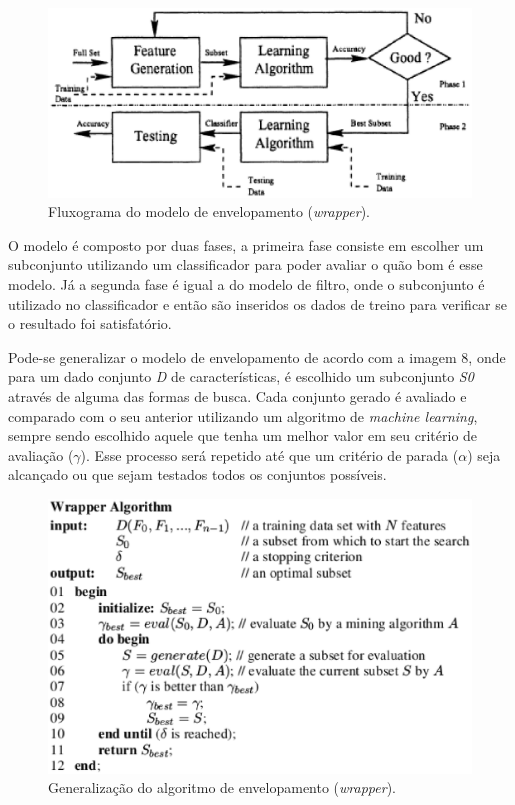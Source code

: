 \begin{figure}[h]
	\centering
	\label{fig07}
		\includegraphics[keepaspectratio=true,scale=1]{figuras/fig06.eps}
	\caption{Fluxograma do modelo de envelopamento (\textit{wrapper}). \cite{huan_1998}}
\end{figure}

O modelo é composto por duas fases, a primeira fase consiste em escolher um subconjunto utilizando um classificador para poder avaliar o quão bom é esse modelo. Já a segunda fase é igual a do modelo de filtro, onde o subconjunto é utilizado no classificador e então são inseridos os dados de treino para verificar se o resultado foi satisfatório.

Pode-se generalizar o modelo de envelopamento de acordo com a imagem 8, onde para um dado conjunto \textit{D} de características, é escolhido um subconjunto \textit{S0} através de alguma das formas de busca. Cada conjunto gerado é avaliado e comparado com o seu anterior utilizando um algoritmo de \textit{machine learning}, sempre sendo escolhido aquele que tenha um melhor valor em seu critério de avaliação ($\gamma$). Esse processo será repetido até que um critério de parada ($\alpha$) seja alcançado ou que sejam testados todos os conjuntos possíveis. \cite{liu_2005}


\begin{figure}[h]
	\centering
	\label{fig08}
		\includegraphics[keepaspectratio=true,scale=0.7]{figuras/fig08.eps}
	\caption{Generalização do algoritmo de envelopamento (\textit{wrapper}). \cite{liu_2005}}
\end{figure}

